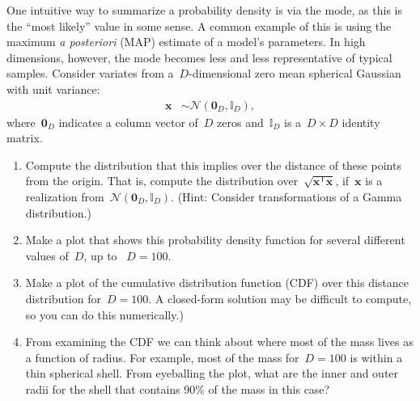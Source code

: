 \documentclass{harvardml}
\newcommand{\trans}{\mathsf{T}}
\newcommand{\bx}{\mathbf{x}}
\newcommand{\distNorm}{\mathcal{N}}
\newcommand{\bzero}{\mathbf{0}}
\newcommand{\ident}{\mathbb{I}}
\begin{document}
\begin{problem}[10pts]
One intuitive way to summarize a probability density is via the mode,
as this is the ``most likely'' value in some sense.  A common example
of this is using the maximum \textit{a posteriori} (MAP) estimate of a
model's parameters.  In high dimensions, however, the mode becomes
less and less representative of typical samples.  Consider variates
from a~$D$-dimensional zero mean spherical Gaussian with unit
variance:
\begin{align*}
  \bx &\sim \distNorm(\bzero_D, \ident_D),
\end{align*}
where~$\bzero_D$ indicates a column vector of~$D$ zeros and~$\ident_D$
is a~${D\times D}$ identity matrix.
\begin{enumerate}
  \item Compute the distribution that this implies over the distance
    of these points from the origin.  That is, compute the
    distribution over~$\sqrt{\bx^\trans\bx}$, if~$\bx$ is a
    realization from~$\distNorm(\bzero_D, \ident_D)$.  (Hint: Consider
    transformations of a Gamma distribution.)
  \item Make a plot that shows this probability density function for
    several different values of~$D$, up to ~${D=100}$.

  \item Make a plot of the cumulative distribution function (CDF) over
    this distance distribution for~${D=100}$.  A closed-form solution
    may be difficult to compute, so you can do this numerically.)

  \item From examining the CDF we can think about where most of the
    mass lives as a function of radius.  For example, most of the mass
    for~${D=100}$ is within a thin spherical shell.  From eyeballing
    the plot, what are the inner and outer radii for the shell that
    contains 90\% of the mass in this case?
\end{enumerate}
\end{problem}
\end{document}
